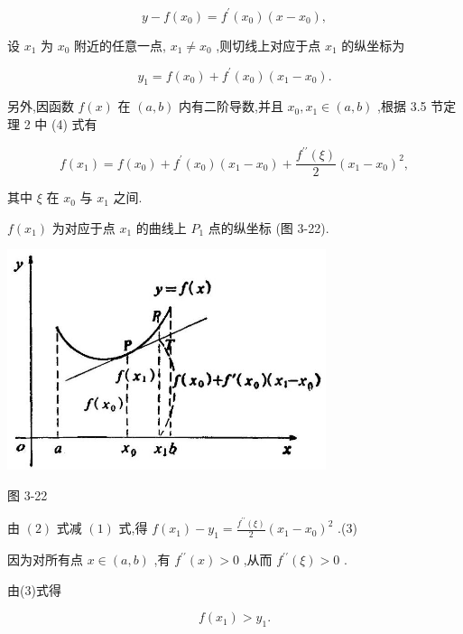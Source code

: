 \documentclass[10pt]{article}
\begin{document}
\[
y - f\left( {x}_{0}\right) = {f}^{\prime }\left( {x}_{0}\right) \left( {x - {x}_{0}}\right) ,
\]

设 \({x}_{1}\) 为 \({x}_{0}\) 附近的任意一点, \({x}_{1} \neq {x}_{0}\) ,则切线上对应于点 \({x}_{1}\) 的纵坐标为

\[
{y}_{1} = f\left( {x}_{0}\right) + {f}^{\prime }\left( {x}_{0}\right) \left( {{x}_{1} - {x}_{0}}\right) . \tag{1}
\]

另外,因函数 \(f\left( x\right)\) 在 \(\left( {a,b}\right)\) 内有二阶导数,并且 \({x}_{0},{x}_{1} \in \left( {a,b}\right)\) ,根据 3.5 节定理 2 中 (4) 式有

\[
f\left( {x}_{1}\right) = f\left( {x}_{0}\right) + {f}^{\prime }\left( {x}_{0}\right) \left( {{x}_{1} - {x}_{0}}\right) + \frac{{f}^{\prime \prime }\left( \xi \right) }{2}{\left( {x}_{1} - {x}_{0}\right) }^{2}, \tag{2}
\]

其中 \(\xi\) 在 \({x}_{0}\) 与 \({x}_{1}\) 之间.

\(f\left( {x}_{1}\right)\) 为对应于点 \({x}_{1}\) 的曲线上 \({P}_{1}\) 点的纵坐标 (图 3-22).

\begin{center}
\includegraphics[max width=0.7\textwidth]{images/01912c18-5c3f-733d-b775-749ba9897a9d_167_239614.jpg}
\end{center}

图 3-22

由 \(\left( 2\right)\) 式减 \(\left( 1\right)\) 式,得 \(f\left( {x}_{1}\right) - {y}_{1} = \frac{{f}^{\prime \prime }\left( \xi \right) }{2}{\left( {x}_{1} - {x}_{0}\right) }^{2}\) .(3)

因为对所有点 \(x \in \left( {a,b}\right)\) ,有 \({f}^{\prime \prime }\left( x\right) > 0\) ,从而 \({f}^{\prime \prime }\left( \xi \right) > 0\) .

由(3)式得

\[
f\left( {x}_{1}\right) > {y}_{1}\text{.} \tag{4}
\]
\end{document}
